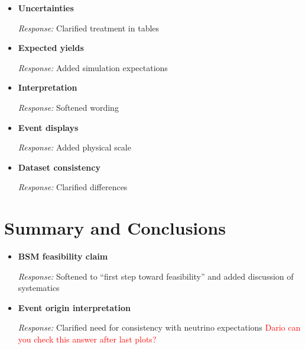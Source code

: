 \documentclass[11pt]{article}
\begin{document}
\begin{itemize}[leftmargin=*]

\item \textbf{Uncertainties}

\textit{Response:} Clarified treatment in tables


\item \textbf{Expected yields}

\textit{Response:} Added simulation expectations


\item \textbf{Interpretation}

\textit{Response:} Softened wording


\item \textbf{Event displays}

\textit{Response:} Added physical scale


\item \textbf{Dataset consistency}

\textit{Response:} Clarified differences

\end{itemize}

\section*{Summary and Conclusions}

\begin{itemize}[leftmargin=*]

\item \textbf{BSM feasibility claim}

\textit{Response:} Softened to ``first step toward feasibility'' and added discussion of systematics


\item \textbf{Event origin interpretation}

\textit{Response:} Clarified need for consistency with neutrino expectations \textcolor{red}{Dario can you check this answer after last plots?}

\end{itemize}
\end{document}
